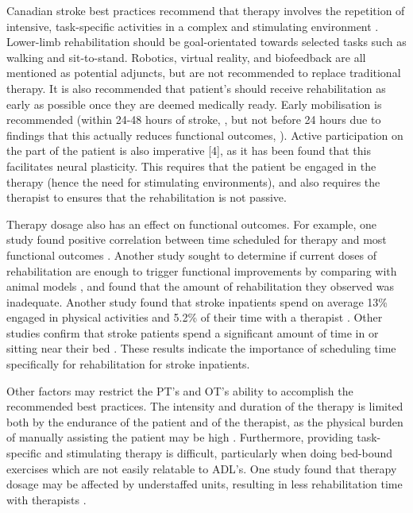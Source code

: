 \documentclass[12pt]{report}
\begin{document}
Canadian stroke best practices recommend that therapy involves the repetition of intensive, task-specific activities in a complex and stimulating environment \cite{Hebert2016}. Lower-limb rehabilitation should be goal-orientated towards selected tasks such as walking and sit-to-stand. Robotics, virtual reality, and biofeedback are all mentioned as potential adjuncts, but are not recommended to replace traditional therapy. It is also recommended that patient's should receive rehabilitation as early as possible once they are deemed medically ready. Early mobilisation is recommended (within 24-48 hours of stroke, \cite{Casaubon2016}, but not before 24 hours due to findings that this actually reduces functional outcomes, \cite{AVERTTrialCollaborationgroup2015}). Active participation on the part of the patient is also imperative [4], as it has been found that this facilitates neural plasticity. This requires that the patient be engaged in the therapy (hence the need for stimulating environments), and also requires the therapist to ensures that the rehabilitation is not passive.

Therapy dosage also has an effect on functional outcomes. For example, one study found positive correlation between time scheduled for therapy and most functional outcomes \cite{Lohse2014}. Another study sought to determine if current doses of rehabilitation are enough to trigger functional improvements by comparing with animal models \cite{Lang2009}, and found that the amount of rehabilitation they observed was inadequate. Another study found that stroke inpatients spend on average 13\% engaged in physical activities and 5.2\% of their time with a therapist \cite{Bernhardt2004}. Other studies confirm that stroke patients spend a significant amount of time in or sitting near their bed \cite{King2011}. These results indicate the importance of scheduling time specifically for rehabilitation for stroke inpatients. 

Other factors may restrict the PT's and OT's ability to accomplish the recommended best practices. The intensity and duration of the therapy is limited both by the endurance of the patient and of the therapist, as the physical burden of manually assisting the patient may be high \cite{Colombo}. Furthermore, providing task-specific and stimulating therapy is difficult, particularly when doing bed-bound exercises which are not easily relatable to ADL's. One study found that therapy dosage may be affected by understaffed units, resulting in less rehabilitation time with therapists \cite{Mchugh2013}.
\end{document}
